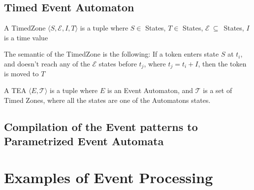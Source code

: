 		\subsection{Timed Event Automaton}
			
				
			\begin{dfn}
				A TimedZone $\langle S,\mathcal{E},I,T \rangle $ is a tuple where $S \in$ States,
				$T \in$ States, 
				$\mathcal{E}~\subseteq$~States,
				$I$ is a time value 
			\end{dfn}
			
			The semantic of the TimedZone is the following: 
				If a token enters state $S$ at $t_i$, and doesn't reach any of the $\mathcal{E}$ states before $t_j$,
				where $t_j = t_i + I$, then the token is moved to $T$
				
			\begin{dfn}
				A TEA
				$\langle E,\mathcal{T} \rangle$ is a tuple where $E$ is an Event Automaton, and $\mathcal{T}$ is a set of Timed Zones, where all the states are one of the 
				Automatons states.
			\end{dfn}

		\subsection{Compilation of the Event patterns to Parametrized Event Automata}
			
			
			
	\section{Examples of Event Processing}
 
